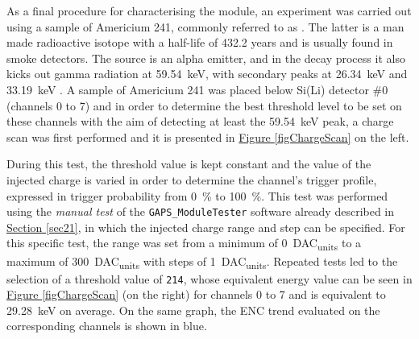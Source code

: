 \par
As a final procedure for characterising the module, an experiment was carried out using a sample of Americium 241, commonly referred to as .  The latter is a man made radioactive isotope with a half-life of 432.2 years and is usually found in smoke detectors. The source is an alpha emitter, and in the decay process it also kicks out gamma radiation at \SI{59.54}{\kilo\electronvolt}, with secondary peaks at \SI{26.34}{\kilo\electronvolt} and \SI{33.19}{\kilo\electronvolt} \cite{agencyfortoxicsubstancesanddiseaseregistry_2004_chemical}. A sample of Americium 241 was placed below Si(Li) detector \#0 (channels 0 to 7) and in order to determine the best threshold level to be set on these channels with the aim of detecting at least the \SI{59.54}{\kilo\electronvolt} peak, a charge scan was first performed and it is presented in \hyperref[figChargeScan]{Figure \ref{figChargeScan}} on the left. 

\par
During this test, the threshold value is kept constant and the value of the injected charge is varied in order to determine the channel's trigger profile, expressed in trigger probability from \SI{0}{\percent} to \SI{100}{\percent}. This test was performed using the \textit{manual test} of the \texttt{GAPS\_ModuleTester} software already described in \hyperref[sec21]{Section \ref{sec21}}, in which the injected charge range and step can be specified. For this specific test, the range was set from a minimum of \SI{0}{DAC_{units}} to a maximum of \SI{300}{DAC_{units}} with steps of \SI{1}{DAC_{units}}. Repeated tests led to the selection of a threshold value of \texttt{214}, whose equivalent energy value can be seen in \hyperref[figChargeScan]{Figure \ref{figChargeScan}} (on the right) for channels 0 to 7 and is equivalent to \SI{29.28}{\kilo\electronvolt} on average. On the same graph, the ENC trend evaluated on the corresponding channels is shown in blue. 

